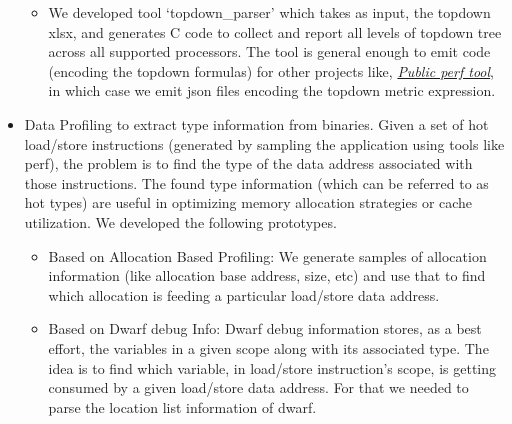 \documentclass[9pt]{article}
\newenvironment{changemargin}[2]{%
  \begin{list}{}{%
    \setlength{\topsep}{0pt}%
    \setlength{\leftmargin}{#1}%
    \setlength{\rightmargin}{#2}%
    \setlength{\listparindent}{\parindent}%
    \setlength{\itemindent}{\parindent}%
    \setlength{\parsep}{\parskip}%
  }%
  \item[]}{\end{list}
}
\newenvironment{body} {
	\vspace*{-16pt}
	\begin{changemargin}{-0.25in}{-0.5in}
  }	
	{\end{changemargin}
}
\begin{document}
\begin{body}
\begin{itemize}
\begin{itemize}
                                \item We developed tool ‘topdown\_parser’ which
                                takes as input, the topdown xlsx, and generates
                                C code to collect and report all levels of
                                topdown tree across all supported processors.
                                The tool is general enough to emit code
                                (encoding the topdown formulas) for other
                                projects like,
                                \emph{\href{https://git.kernel.org/pub/scm/linux/kernel/git/tip/tip.git/tree/tools/perf}{
                                  Public perf tool}}, in which case we emit
                                  json files encoding the topdown metric
                                  expression.

			\end{itemize}

                        \item Data Profiling to extract type information from binaries.
                Given a set of hot load/store instructions (generated by
                    sampling the application using tools like perf), the
                problem is to find the type of the data address associated with
                those instructions. The found type information (which can be
                    referred to as hot types) are useful in optimizing memory
                allocation strategies or cache utilization. We developed the
                following prototypes.

			\begin{itemize}

                          \item Based on Allocation Based Profiling: We
                          generate samples of allocation information (like
                              allocation base address, size, etc) and use that
                          to find which allocation is feeding a particular
                          load/store data address.

                          \item Based on Dwarf debug Info: Dwarf debug
                          information stores, as a best effort, the variables
                          in a given scope along with its associated type. The
                          idea is to find which variable, in load/store
                          instruction's scope, is getting consumed by a given
                          load/store data address. For that we needed to parse
                          the location list information of dwarf.


\end{itemize}
\end{itemize}
\end{body}
\end{document}
